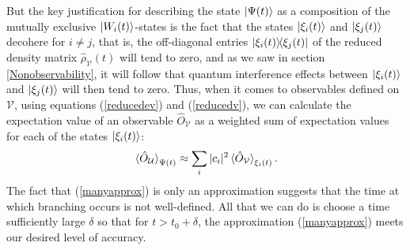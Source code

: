     But the key justification for describing the state $\ket{\Psi(t)}$ as a composition of the mutually exclusive $\ket{W_i(t)}$-states is the fact that the states $\ket{\xi_i(t)}$ and $\ket{\xi_j(t)}$ decohere for $i\neq j$, that is, the off-diagonal entries $\dyad{\xi_i(t)}{\xi_j(t)}$ of the reduced density matrix $\hat{\rho}_\mathcal{V}(t)$ will tend to zero, and as we saw in section \ref{Nonobservability}, it will follow that quantum interference effects between $\ket{\xi_i(t)}$ and $\ket{\xi_j(t)}$ will then tend to zero. Thus, when it comes to observables defined on $\mathcal{V}$, using equations (\ref{reducedev}) and (\ref{reducedv}), we can calculate the expectation value of an observable $\hat{O}_\mathcal{V}$  as a weighted sum of expectation values for each of the states $\ket{\xi_i(t)}$:
    \begin{equation}\label{manyapprox}\ev*{\hat{O}_\mathcal{U}}_{\Psi(t)}\approx\sum_i |c_i|^2 \ev*{\hat{O}_\mathcal{V}}_{\xi_i(t)}.\end{equation}
    The fact that (\ref{manyapprox}) is only an approximation suggests that the time at which branching occurs is not well-defined. All that we can do is choose a time sufficiently large $\delta$ so that for  $t>t_0+\delta$, the approximation (\ref{manyapprox}) meets our desired level of accuracy. 
    
